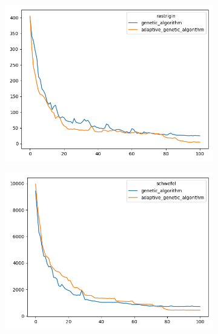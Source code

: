 \documentclass{article}
\begin{document}
\begin{figure}[H]
  \begin{subfigure}[b]{0.5\linewidth}
    \centering
    \includegraphics[width=0.75\linewidth]{age2p_rastrigin.png}
    \label{fig7:a}
    \vspace{4ex}
  \end{subfigure}%
  \begin{subfigure}[b]{0.5\linewidth}
    \centering
    \includegraphics[width=0.75\linewidth]{age2p_schwefel.png}
    \label{fig7:b}
    \vspace{4ex}
  \end{subfigure}
\end{figure}
\end{document}
